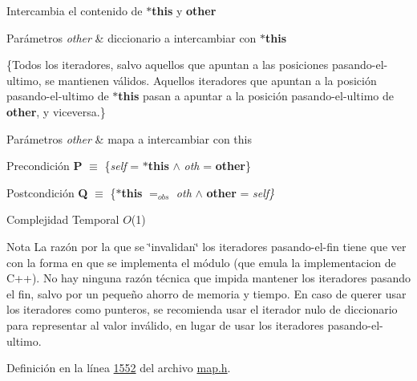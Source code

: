 \-Intercambia el contenido de {\bfseries $\ast$this} y {\bfseries other} 


\begin{DoxyParams}{\-Parámetros}
{\em other} & diccionario a intercambiar con {\bfseries $\ast$this}\\
\hline
\end{DoxyParams}
\{\-Todos los iteradores, salvo aquellos que apuntan a las posiciones pasando-\/el-\/ultimo, se mantienen válidos. \-Aquellos iteradores que apuntan a la posición pasando-\/el-\/ultimo de {\bfseries $\ast$this} pasan a apuntar a la posición pasando-\/el-\/ultimo de {\bfseries other}, y viceversa.\}


\begin{DoxyParams}{\-Parámetros}
{\em other} & mapa a intercambiar con this\\
\hline
\end{DoxyParams}
\begin{DoxyPrecond}{\-Precondición}
{\bfseries \-P} $\equiv$ \{{\itshape self\/} = {\bfseries $\ast$this} $\land$ {\itshape oth\/} = {\bfseries other}\} 
\end{DoxyPrecond}
\begin{DoxyPostcond}{\-Postcondición}
{\bfseries \-Q} $\equiv$ \{{\bfseries $\ast$this} $=_{obs}$ {\itshape oth\/} $\land$ {\bfseries other} = {\itshape self\}\/} 
\end{DoxyPostcond}

\begin{DoxyDescription}
\item[\-Complejidad \-Temporal]$O$(1)
\end{DoxyDescription}

\begin{DoxyNote}{\-Nota}
\-La razón por la que se \char`\"{}invalidan\char`\"{} los iteradores pasando-\/el-\/fin tiene que ver con la forma en que se implementa el módulo (que emula la implementacion de \-C++). \-No hay ninguna razón técnica que impida mantener los iteradores pasando el fin, salvo por un pequeño ahorro de memoria y tiempo. \-En caso de querer usar los iteradores como punteros, se recomienda usar el iterador nulo de diccionario para representar al valor inválido, en lugar de usar los iteradores pasando-\/el-\/ultimo. 
\end{DoxyNote}


\-Definición en la línea \hyperlink{map_8h_source_l01552}{1552} del archivo \hyperlink{map_8h_source}{map.\-h}.


